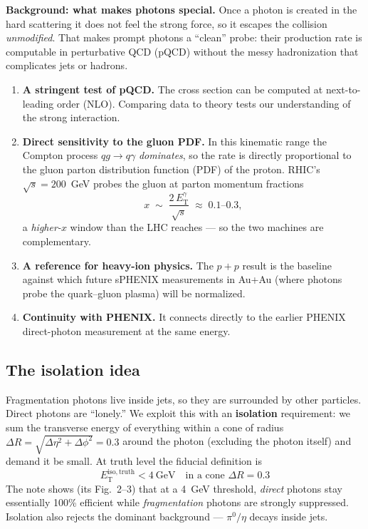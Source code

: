 \documentclass[11pt]{article}
\newlength{\calloutwd}
\newenvironment{bgbox}{%
  \par\vspace{6pt}\noindent
  \setlength{\fboxsep}{8pt}%
  \begingroup\color{black}%
  \def\calloutbg{boxblue}\def\calloutline{bgblueline}%
  \fcolorbox{bgblueline}{boxblue}\bgroup
  \begin{minipage}{\calloutwd}}
  {\end{minipage}\egroup\endgroup\par\vspace{6pt}}
\newcommand{\ETg}{E_{\mathrm{T}}^{\gamma}}
\newcommand{\Eisotruth}{E_{\mathrm{T}}^{\mathrm{iso,truth}}}
\newcommand{\roots}{\sqrt{s}}
\newcommand{\dR}{\Delta R}
\newcommand{\pp}{p{+}p}
\begin{document}
\begin{bgbox}
\textbf{Background: what makes photons special.} Once a photon is created in the hard scattering
it does not feel the strong force, so it escapes the collision \emph{unmodified}. That makes prompt
photons a ``clean'' probe: their production rate is computable in perturbative QCD (pQCD) without
the messy hadronization that complicates jets or hadrons.
\end{bgbox}

\begin{enumerate}[leftmargin=1.6em]
  \item \textbf{A stringent test of pQCD.} The cross section can be computed at next-to-leading
  order (NLO). Comparing data to theory tests our understanding of the strong interaction.
  \item \textbf{Direct sensitivity to the gluon PDF.} In this kinematic range the
  Compton process $qg\to q\gamma$ \emph{dominates}, so the rate is directly proportional to the
  gluon parton distribution function (PDF) of the proton. RHIC's $\roots=200$~GeV probes the
  gluon at parton momentum fractions
  \[
    x \;\sim\; \frac{2\,\ETg}{\roots} \;\approx\; 0.1\text{--}0.3 ,
  \]
  a \emph{higher-$x$} window than the LHC reaches --- so the two machines are complementary.
  \item \textbf{A reference for heavy-ion physics.} The $\pp$ result is the baseline against
  which future sPHENIX measurements in Au+Au (where photons probe the quark--gluon plasma) will
  be normalized.
  \item \textbf{Continuity with PHENIX.} It connects directly to the earlier PHENIX
  direct-photon measurement at the same energy.
\end{enumerate}

\subsection{The isolation idea}

Fragmentation photons live inside jets, so they are surrounded by other particles. Direct photons
are ``lonely.'' We exploit this with an \textbf{isolation} requirement: we sum the transverse
energy of everything within a cone of radius $\dR=\sqrt{\Delta\eta^2+\Delta\phi^2}=0.3$ around the
photon (excluding the photon itself) and demand it be small. At truth level the fiducial definition is
\[
  \boxed{\;\Eisotruth < 4~\text{GeV} \quad\text{in a cone } \dR = 0.3\;}
\]
The note shows (its Fig.~2--3) that at a 4~GeV threshold, \emph{direct} photons stay essentially
100\% efficient while \emph{fragmentation} photons are strongly suppressed. Isolation also rejects
the dominant background --- $\pi^0/\eta$ decays inside jets.
\end{document}
